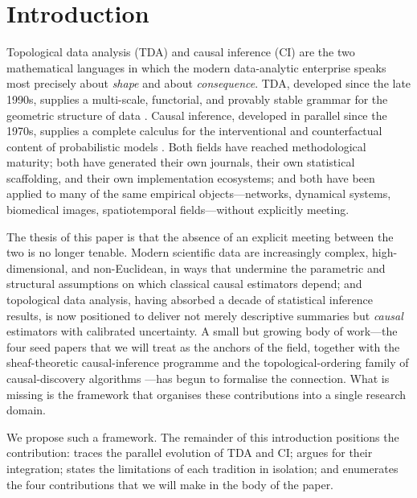\section{Introduction}\label{sec:introduction}

Topological data analysis (TDA) and causal inference (CI) are the two
mathematical languages in which the modern data-analytic enterprise
speaks most precisely about \emph{shape} and about \emph{consequence}.
TDA, developed since the late 1990s, supplies a multi-scale,
functorial, and provably stable grammar for the geometric structure of
data \citep{edelsbrunner2002topological,carlsson2009topology,
edelsbrunner2010computational,wasserman2018topological,
chazal2021introduction}. Causal inference, developed in parallel since
the 1970s, supplies a complete calculus for the interventional and
counterfactual content of probabilistic models
\citep{rubin1974estimating,pearl1995causal,pearl2009causality,
imbens2015causal,peters2017elements,bareinboim2020pearls}. Both fields
have reached methodological maturity; both have generated their own
journals, their own statistical scaffolding, and their own
implementation ecosystems; and both have been applied to many of the
same empirical objects---networks, dynamical systems, biomedical
images, spatiotemporal fields---without explicitly meeting.

The thesis of this paper is that the absence of an explicit meeting
between the two is no longer tenable. Modern scientific data are
increasingly complex, high-dimensional, and non-Euclidean, in ways
that undermine the parametric and structural assumptions on which
classical causal estimators depend; and topological data analysis,
having absorbed a decade of statistical inference results, is now
positioned to deliver not merely descriptive summaries but
\emph{causal} estimators with calibrated uncertainty. A small but
growing body of work---the four seed papers
\citep{ibeling2021topological,kim2026topological,lecci2014statistical,
elyaagoubi2023statistical} that we will treat as the anchors of the
field, together with the sheaf-theoretic causal-inference programme
\citep{mahadevan2021causal,mahadevan2022universal,mahadevan2025sheaf}
and the topological-ordering family of causal-discovery algorithms
\citep{rolland2022score,tran2024constraining,xu2025information,
nocurl2024,wu2026optimization}---has begun to formalise the
connection. What is missing is the framework that organises these
contributions into a single research domain.

We propose such a framework. The remainder of this introduction
positions the contribution:  traces the
parallel evolution of TDA and CI;  argues for
their integration;  states the limitations of
each tradition in isolation; and 
enumerates the four contributions that we will make in the body of
the paper.

